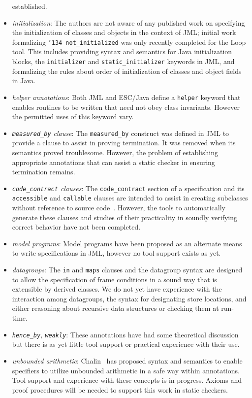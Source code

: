 \documentclass{sig-alternate}
\begin{document}
\begin{itemize}
established.
\item \textit{initialization}:  The authors are not aware of any published work on specifying the initialization
of classes and objects in the context of JML; initial work formalizing
\texttt{\char'134 not\_initialized} was only recently completed for
the Loop tool.  This includes providing syntax and semantics for
Java initialization blocks, the \texttt{initializer} and \texttt{static\_initializer} keywords in
JML, and formalizing the rules about order of initialization of classes and object fields in Java.
\item \textit{helper annotations}:  Both JML and ESC/Java define a \texttt{helper} keyword that enables 
routines to be written that need not obey class invariants.  However the permitted uses of this
keyword vary.
\item \textit{\texttt{measured\_by} clause}:  The \texttt{measured\_by} construct was defined in JML to
provide a clause to assist in proving termination.  It was removed when its semantics
proved troublesome.  However, the problem of establishing appropriate annotations that
can assist a static checker in ensuring termination remains.
\item \textit{\texttt{code\_contract} clauses}:  The \texttt{code\_contract} section of a specification and its
\texttt{accessible} and \texttt{callable} clauses are intended to assist in creating subclasses 
without reference to source code~\cite{Ruby-Leavens00}.  However, the tools to automatically
generate these clauses and studies of their practicality in soundly verifying correct behavior have
not been completed.
\item \textit{model programs}:  Model programs have been proposed as an alternate means to write
specifications in JML, however no tool support exists as yet.
\item \textit{datagroups}:  The \texttt{in} and \texttt{maps} clauses and the datagroup syntax are designed
to allow the specification of frame conditions in a sound way that is extensible by derived classes. 
We do not yet have experience with the interaction among datagroups, the syntax for designating store locations, and either reasoning about recursive data structures or checking them at 
run-time.
\item \textit{\texttt{hence\_by}, \texttt{weakly}}:  These annotations have had some theoretical discussion but
there is as yet little tool support or practical experience with their use.
\item \textit{unbounded
  arithmetic}:  Chalin~\cite{Chalin03} has proposed syntax and semantics to enable specifiers to utilize unbounded arithmetic in a safe way within annotations.  Tool support and experience with
these concepts is in progress.  Axioms and proof procedures will be needed to support this work
in static checkers.
\end{itemize}
\end{document}
